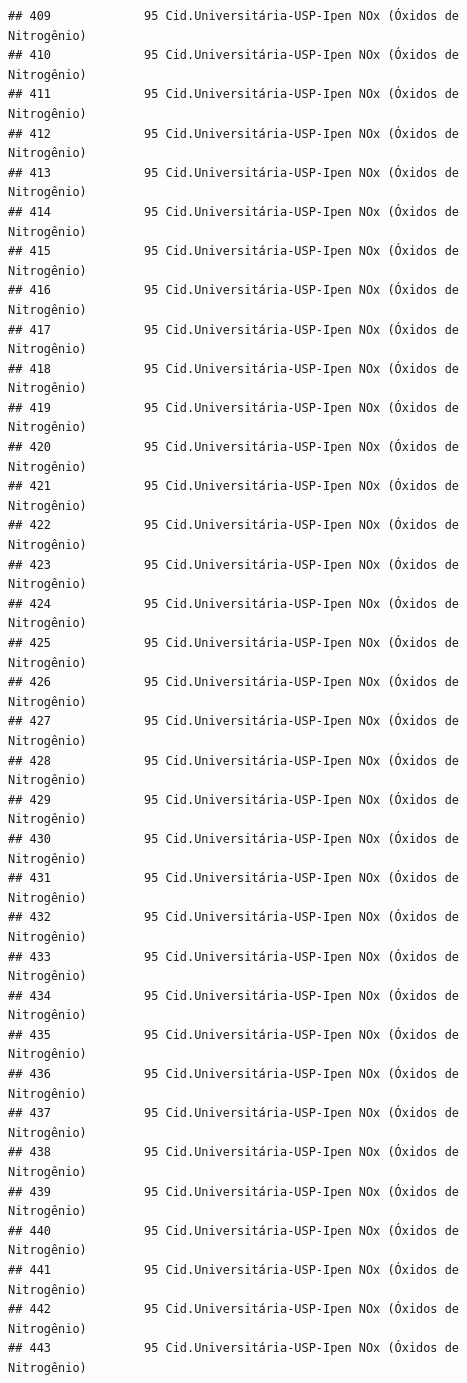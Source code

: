 \documentclass[]{book}
\begin{document}
\begin{verbatim}
## 409             95 Cid.Universitária-USP-Ipen NOx (Óxidos de Nitrogênio)
## 410             95 Cid.Universitária-USP-Ipen NOx (Óxidos de Nitrogênio)
## 411             95 Cid.Universitária-USP-Ipen NOx (Óxidos de Nitrogênio)
## 412             95 Cid.Universitária-USP-Ipen NOx (Óxidos de Nitrogênio)
## 413             95 Cid.Universitária-USP-Ipen NOx (Óxidos de Nitrogênio)
## 414             95 Cid.Universitária-USP-Ipen NOx (Óxidos de Nitrogênio)
## 415             95 Cid.Universitária-USP-Ipen NOx (Óxidos de Nitrogênio)
## 416             95 Cid.Universitária-USP-Ipen NOx (Óxidos de Nitrogênio)
## 417             95 Cid.Universitária-USP-Ipen NOx (Óxidos de Nitrogênio)
## 418             95 Cid.Universitária-USP-Ipen NOx (Óxidos de Nitrogênio)
## 419             95 Cid.Universitária-USP-Ipen NOx (Óxidos de Nitrogênio)
## 420             95 Cid.Universitária-USP-Ipen NOx (Óxidos de Nitrogênio)
## 421             95 Cid.Universitária-USP-Ipen NOx (Óxidos de Nitrogênio)
## 422             95 Cid.Universitária-USP-Ipen NOx (Óxidos de Nitrogênio)
## 423             95 Cid.Universitária-USP-Ipen NOx (Óxidos de Nitrogênio)
## 424             95 Cid.Universitária-USP-Ipen NOx (Óxidos de Nitrogênio)
## 425             95 Cid.Universitária-USP-Ipen NOx (Óxidos de Nitrogênio)
## 426             95 Cid.Universitária-USP-Ipen NOx (Óxidos de Nitrogênio)
## 427             95 Cid.Universitária-USP-Ipen NOx (Óxidos de Nitrogênio)
## 428             95 Cid.Universitária-USP-Ipen NOx (Óxidos de Nitrogênio)
## 429             95 Cid.Universitária-USP-Ipen NOx (Óxidos de Nitrogênio)
## 430             95 Cid.Universitária-USP-Ipen NOx (Óxidos de Nitrogênio)
## 431             95 Cid.Universitária-USP-Ipen NOx (Óxidos de Nitrogênio)
## 432             95 Cid.Universitária-USP-Ipen NOx (Óxidos de Nitrogênio)
## 433             95 Cid.Universitária-USP-Ipen NOx (Óxidos de Nitrogênio)
## 434             95 Cid.Universitária-USP-Ipen NOx (Óxidos de Nitrogênio)
## 435             95 Cid.Universitária-USP-Ipen NOx (Óxidos de Nitrogênio)
## 436             95 Cid.Universitária-USP-Ipen NOx (Óxidos de Nitrogênio)
## 437             95 Cid.Universitária-USP-Ipen NOx (Óxidos de Nitrogênio)
## 438             95 Cid.Universitária-USP-Ipen NOx (Óxidos de Nitrogênio)
## 439             95 Cid.Universitária-USP-Ipen NOx (Óxidos de Nitrogênio)
## 440             95 Cid.Universitária-USP-Ipen NOx (Óxidos de Nitrogênio)
## 441             95 Cid.Universitária-USP-Ipen NOx (Óxidos de Nitrogênio)
## 442             95 Cid.Universitária-USP-Ipen NOx (Óxidos de Nitrogênio)
## 443             95 Cid.Universitária-USP-Ipen NOx (Óxidos de Nitrogênio)

\end{verbatim}
\end{document}
